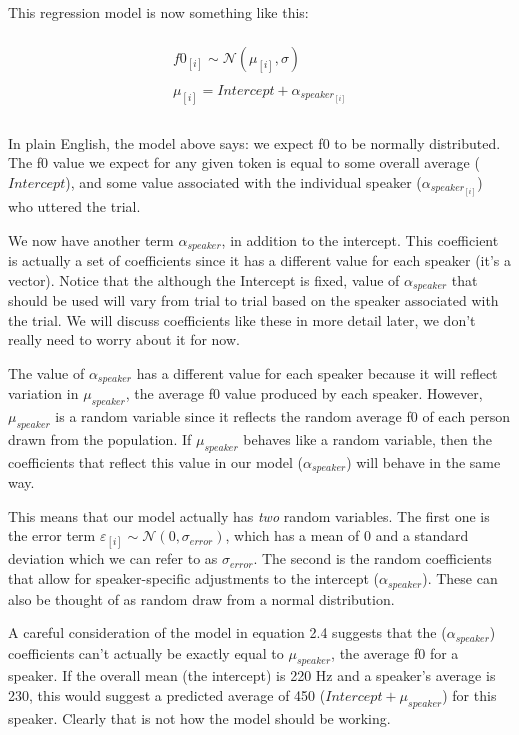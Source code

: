 \documentclass[
]{book}
\begin{document}
This regression model is now something like this:

\begin{equation}
\begin{split}
\\
f0_{[i]} \sim \mathcal{N}(\mu_{[i]},\sigma) \\ \\
\mu_{[i]} = Intercept + \alpha_{speaker_{[i]}} \\
\\
\end{split}
\label{eq:26}
\end{equation}

In plain English, the model above says: we expect f0 to be normally distributed. The f0 value we expect for any given token is equal to some overall average (\(Intercept\)), and some value associated with the individual speaker (\(\alpha_{speaker_{[i]}}\)) who uttered the trial.

We now have another term \(\alpha_{speaker}\), in addition to the intercept. This coefficient is actually a set of coefficients since it has a different value for each speaker (it's a vector). Notice that the although the Intercept is fixed, value of \(\alpha_{speaker}\) that should be used will vary from trial to trial based on the speaker associated with the trial. We will discuss coefficients like these in more detail later, we don't really need to worry about it for now.

The value of \(\alpha_{speaker}\) has a different value for each speaker because it will reflect variation in \(\mu_{speaker}\), the average f0 value produced by each speaker. However, \(\mu_{speaker}\) is a random variable since it reflects the random average f0 of each person drawn from the population. If \(\mu_{speaker}\) behaves like a random variable, then the coefficients that reflect this value in our model (\(\alpha_{speaker}\)) will behave in the same way.

This means that our model actually has \emph{two} random variables. The first one is the error term \(\varepsilon_{[i]} \sim \mathcal{N}(0,\sigma_{error})\), which has a mean of 0 and a standard deviation which we can refer to as \(\sigma_{error}\). The second is the random coefficients that allow for speaker-specific adjustments to the intercept (\(\alpha_{speaker}\)). These can also be thought of as random draw from a normal distribution.

A careful consideration of the model in equation 2.4 suggests that the (\(\alpha_{speaker}\)) coefficients can't actually be exactly equal to \(\mu_{speaker}\), the average f0 for a speaker. If the overall mean (the intercept) is 220 Hz and a speaker's average is 230, this would suggest a predicted average of 450 (\(Intercept + \mu_{speaker}\)) for this speaker. Clearly that is not how the model should be working.
\end{document}
